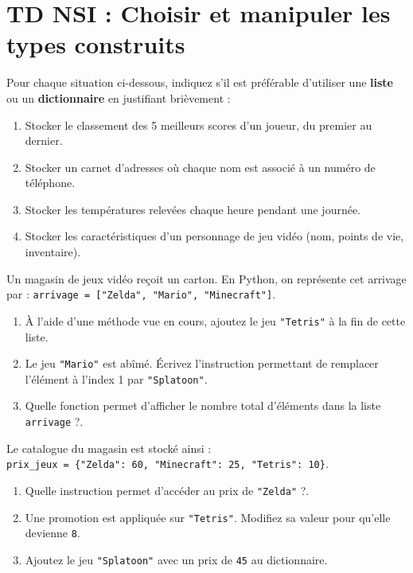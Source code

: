 \setcounter{Exercise}{0}

\section*{TD NSI : Choisir et manipuler les types construits}

\begin{Exercise}[title={Le bon choix de structure}]
Pour chaque situation ci-dessous, indiquez s'il est préférable d'utiliser une \textbf{liste} ou un \textbf{dictionnaire} en justifiant brièvement :
\begin{enumerate}
    \item Stocker le classement des 5 meilleurs scores d'un joueur, du premier au dernier.
    \item Stocker un carnet d'adresses où chaque nom est associé à un numéro de téléphone.
    \item Stocker les températures relevées chaque heure pendant une journée.
    \item Stocker les caractéristiques d'un personnage de jeu vidéo (nom, points de vie, inventaire).
\end{enumerate}
\end{Exercise}

\begin{Exercise}[title={Gestion d'un inventaire (Listes)}]
Un magasin de jeux vidéo reçoit un carton. En Python, on représente cet arrivage par : 
\texttt{arrivage = ["Zelda", "Mario", "Minecraft"]}.
\begin{enumerate}
    \item À l'aide d'une méthode vue en cours, ajoutez le jeu \texttt{"Tetris"} à la fin de cette liste.
    \item Le jeu \texttt{"Mario"} est abîmé. Écrivez l'instruction permettant de remplacer l'élément à l'index 1 par \texttt{"Splatoon"}.
    \item Quelle fonction permet d'afficher le nombre total d'éléments dans la liste \texttt{arrivage} ?.
\end{enumerate}
\end{Exercise}

\begin{Exercise}[title={Le Catalogue des prix (Dictionnaires)}]
Le catalogue du magasin est stocké ainsi : \\
\texttt{prix\_jeux = \{"Zelda": 60, "Minecraft": 25, "Tetris": 10\}}.
\begin{enumerate}
    \item Quelle instruction permet d'accéder au prix de \texttt{"Zelda"} ?.
    \item Une promotion est appliquée sur \texttt{"Tetris"}. Modifiez sa valeur pour qu'elle devienne \texttt{8}.
    \item Ajoutez le jeu \texttt{"Splatoon"} avec un prix de \texttt{45} au dictionnaire.
\end{enumerate}
\end{Exercise}

